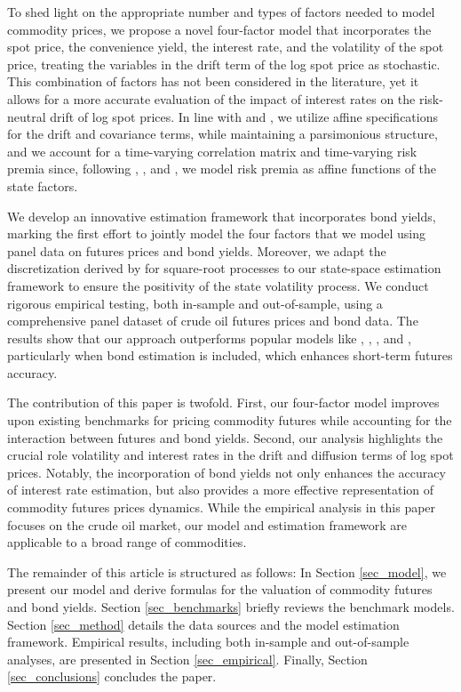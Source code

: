 \documentclass{article}
\begin{document}
To shed light on the appropriate number and types of factors needed to model commodity prices, we propose a novel four-factor model that incorporates the spot price, the convenience yield, the interest rate, and the volatility of the spot price, treating the variables in the drift term of the log spot price as stochastic. This combination of factors has not been considered in the literature, yet it allows for a more accurate evaluation of the impact of interest rates on the risk-neutral drift of log spot prices. In line with \cite{hughen10} and \cite{spinler17}, we utilize affine specifications for the drift and covariance terms, while maintaining a parsimonious structure, and we account for a time-varying correlation matrix and time-varying risk premia since, following \cite{duffee02}, \cite{casassus05}, and \cite{cheridito07}, we model risk premia as affine functions of the state factors. 

We develop an innovative estimation framework that incorporates bond yields, marking the first effort to jointly model the four factors that we model using panel data on futures prices and bond yields. Moreover, we adapt the discretization derived by \cite{kelly23} for square-root processes to our state-space estimation framework to ensure the positivity of the state volatility process. We conduct rigorous empirical testing, both in-sample and out-of-sample, using a comprehensive panel dataset of crude oil futures prices and bond data. The results show that our approach outperforms popular models like \cite{schwartz97}, \cite{yan02}, \cite{hughen10}, and \cite{spinler17}, particularly when bond estimation is included, which enhances short-term futures accuracy.

The contribution of this paper is twofold. First, our four-factor model improves upon existing benchmarks for pricing commodity futures while accounting for the interaction between futures and bond yields. Second, our analysis highlights the crucial role volatility and interest rates in the drift and diffusion terms of log spot prices. Notably, the incorporation of bond yields not only enhances the accuracy of interest rate estimation, but also provides a more effective representation of commodity futures prices dynamics. While the empirical analysis in this paper focuses on the crude oil market, our model and estimation framework are applicable to a broad range of commodities.

The remainder of this article is structured as follows: In Section \ref{sec_model}, we present our model and derive formulas for the valuation of commodity futures and bond yields. Section \ref{sec_benchmarks} briefly reviews the benchmark models. Section \ref{sec_method} details the data sources and the model estimation framework. Empirical results, including both in-sample and out-of-sample analyses, are presented in Section \ref{sec_empirical}. Finally, Section \ref{sec_conclusions} concludes the paper.
\end{document}
